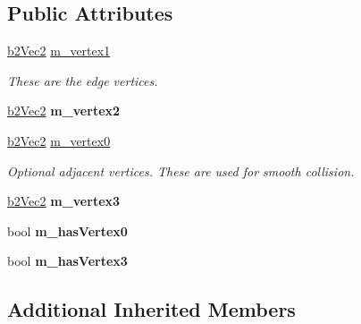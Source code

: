 \subsection*{Public Attributes}
\begin{DoxyCompactItemize}
\item 
\hyperlink{structb2_vec2}{b2\+Vec2} \hyperlink{classb2_edge_shape_a916cf02a752ff1a70db35b2edaf19bb4}{m\+\_\+vertex1}\hypertarget{classb2_edge_shape_a916cf02a752ff1a70db35b2edaf19bb4}{}\label{classb2_edge_shape_a916cf02a752ff1a70db35b2edaf19bb4}

\begin{DoxyCompactList}\small\item\em These are the edge vertices. \end{DoxyCompactList}\item 
\hyperlink{structb2_vec2}{b2\+Vec2} {\bfseries m\+\_\+vertex2}\hypertarget{classb2_edge_shape_aa218bfe2bf135e4e94028b29aaa32fce}{}\label{classb2_edge_shape_aa218bfe2bf135e4e94028b29aaa32fce}

\item 
\hyperlink{structb2_vec2}{b2\+Vec2} \hyperlink{classb2_edge_shape_a907c9829484cc1ba7527ab368e9fdf93}{m\+\_\+vertex0}\hypertarget{classb2_edge_shape_a907c9829484cc1ba7527ab368e9fdf93}{}\label{classb2_edge_shape_a907c9829484cc1ba7527ab368e9fdf93}

\begin{DoxyCompactList}\small\item\em Optional adjacent vertices. These are used for smooth collision. \end{DoxyCompactList}\item 
\hyperlink{structb2_vec2}{b2\+Vec2} {\bfseries m\+\_\+vertex3}\hypertarget{classb2_edge_shape_a7991fd8b38806a7785748cd991c18452}{}\label{classb2_edge_shape_a7991fd8b38806a7785748cd991c18452}

\item 
bool {\bfseries m\+\_\+has\+Vertex0}\hypertarget{classb2_edge_shape_a1d0f39259f0963146b343d6b048f3f8a}{}\label{classb2_edge_shape_a1d0f39259f0963146b343d6b048f3f8a}

\item 
bool {\bfseries m\+\_\+has\+Vertex3}\hypertarget{classb2_edge_shape_afeb0dfac66fe677ccd765d48610fa56f}{}\label{classb2_edge_shape_afeb0dfac66fe677ccd765d48610fa56f}

\end{DoxyCompactItemize}
\subsection*{Additional Inherited Members}


